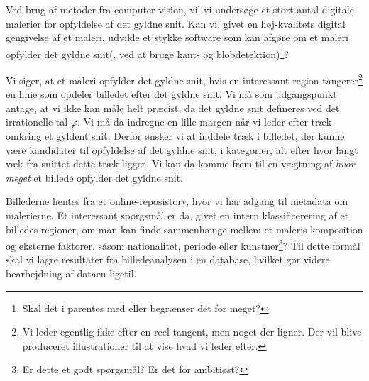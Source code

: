 Ved brug af metoder fra computer vision, vil vi undersøge et stort antal
digitale malerier for opfyldelse af det gyldne snit. Kan vi, givet en
høj-kvalitets digital gengivelse af et maleri, udvikle et stykke software som
kan afgøre om et maleri opfylder det gyldne snit(, ved at bruge kant- og
blobdetektion)\footnote{Skal det i parentes med eller begrænser det for
meget?}?

Vi siger, at et maleri opfylder det gyldne snit, hvis en interessant region
tangerer\footnote{Vi leder egentlig ikke efter en reel tangent, men noget der
ligner. Der vil blive produceret illustrationer til at vise hvad vi leder
efter.} en linie som opdeler billedet efter det gyldne snit. Vi må som
udgangspunkt antage, at vi ikke kan måle helt præcist, da det gyldne snit
defineres ved det irrationelle tal $\varphi$. Vi må da indregne en lille margen
når vi leder efter træk omkring et gyldent snit.  Derfor ønsker vi at inddele
træk i billedet, der kunne være kandidater til opfyldelse af det gyldne snit, i
kategorier, alt efter hvor langt væk fra snittet dette træk ligger. Vi kan da
komme frem til en vægtning af \emph{hvor meget} et billede opfylder det gyldne
snit.

Billederne hentes fra et online-reposistory, hvor vi har adgang til metadata om
malerierne. Et interessant spørgsmål er da, givet en intern klassificerering af
et billedes regioner, om man kan finde sammenhænge mellem et maleris
komposition og eksterne faktorer, såsom nationalitet, periode eller
kunstner\footnote{Er dette et godt spørgsmål? Er det for ambitiøst?}?  Til
dette formål skal vi lagre resultater fra billedeanalysen i en database,
hvilket gør videre bearbejdning af dataen ligetil.
